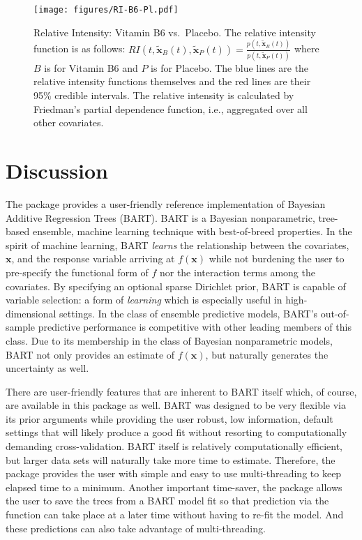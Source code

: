 \documentclass[article]{jss}
\begin{document}
\begin{figure}[h]
\begin{center}
\texttt{[image: figures/RI-B6-Pl.pdf]}
\end{center}
\caption{\label{RI-B6-Pl}
Relative Intensity: Vitamin B6 vs.\ Placebo.  
  The relative intensity function is as follows:
  $RI(t,\tilde{\bm{x}}_B(t),\tilde{\bm{x}}_P(t))=\frac{p(t,\tilde{\bm{x}}_B(t))}{p(t,\tilde{\bm{x}}_{P}(t))}$
  where $B$ is for Vitamin B6 and $P$ is for Placebo.  The blue lines
  are the relative intensity functions themselves and the red lines
  are their 95\% credible intervals.  The relative intensity is
  calculated by Friedman's partial dependence function, i.e., 
  aggregated over all other covariates.}
\end{figure}

\section{Discussion}

The   package provides a user-friendly reference
implementation of Bayesian Additive Regression Trees (BART).  BART is
a Bayesian nonparametric, tree-based ensemble, machine learning
technique with best-of-breed properties.  In the spirit of machine
learning, BART {\it learns} the relationship between the covariates,
$\bm{x}$, and the response variable arriving at $f(\bm{x})$ while not
burdening the user to pre-specify the functional form of $f$ nor the
interaction terms among the covariates.  By specifying an optional
sparse Dirichlet prior, BART is capable of variable selection: a form
of {\it learning} which is especially useful in high-dimensional
settings.  In the class of ensemble predictive models, BART's
out-of-sample predictive performance is competitive with other leading
members of this class.  Due to its membership in the class of Bayesian
nonparametric models, BART not only provides an estimate of
$f(\bm{x})$, but naturally generates the uncertainty as well.

There are user-friendly features that are inherent to BART itself
which, of course, are available in this package as well.  BART was
designed to be very flexible via its prior arguments while providing
the user robust, low information, default settings that will likely
produce a good fit without resorting to computationally demanding
cross-validation.  BART itself is relatively computationally
efficient, but larger data sets will naturally take more time to
estimate.  Therefore, the  package provides the user with
simple and easy to use multi-threading to keep elapsed time to a
minimum.  Another important time-saver, the  package allows
the user to save the trees from a BART model fit so that prediction
via the   function can take place at a later
time without having to re-fit the model.  And these predictions can
also take advantage of multi-threading.
\end{document}
